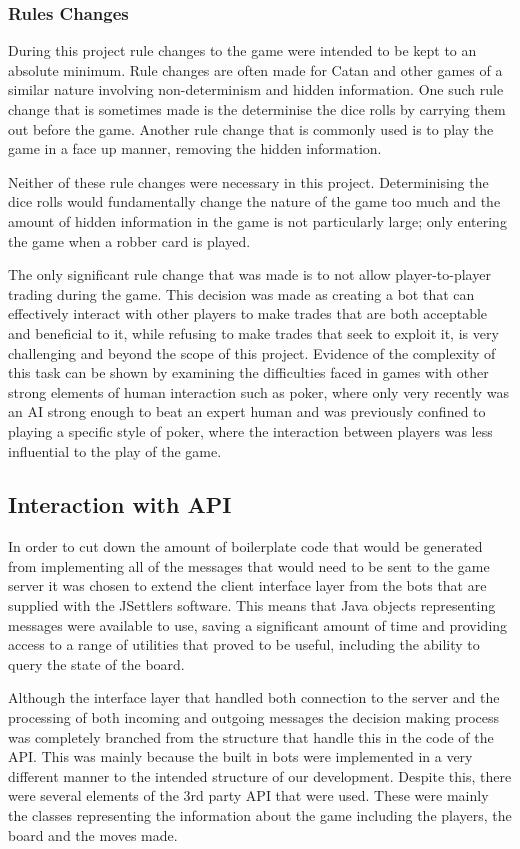 \documentclass[]{article}
\begin{document}
\subsubsection{Rules Changes}
During this project rule changes to the game were intended to be kept to an absolute minimum. Rule changes are often made for Catan and other games of a similar nature involving non-determinism and hidden information. One such rule change that is sometimes made is the determinise the dice rolls by carrying them out before the game. Another rule change that is commonly used is to play the game in a face up manner, removing the hidden information.

Neither of these rule changes were necessary in this project. Determinising the dice rolls would fundamentally change the nature of the game too much and the amount of hidden information in the game is not particularly large; only entering the game when a robber card is played.

The only significant rule change that was made is to not allow player-to-player trading during the game. This decision was made as creating a bot that can effectively interact with other players to make trades that are both acceptable and beneficial to it, while refusing to make trades that seek to exploit it, is very challenging and beyond the scope of this project. Evidence of the complexity of this task can be shown by examining the difficulties faced in games with other strong elements of human interaction such as poker, where only very recently was an AI strong enough to beat an expert human and was previously confined to playing a specific style of poker, where the interaction between players was less influential to the play of the game.

\subsection{Interaction with API}
In order to cut down the amount of boilerplate code that would be generated from implementing all of the messages that would need to be sent to the game server it was chosen to extend the client interface layer from the bots that are supplied with the JSettlers software. This means that Java objects representing messages were available to use, saving a significant amount of time and providing access to a range of utilities that proved to be useful, including the ability to query the state of the board.

\par Although the interface layer that handled both connection to the server and the processing of both incoming and outgoing messages the decision making process was completely branched from the structure that handle this in the code of the API. This was mainly because the built in bots were implemented in a very different manner to the intended structure of our development. Despite this, there were several elements of the 3rd party API that were used. These were mainly the classes representing the information about the game including the players, the board and the moves made.
\end{document}

